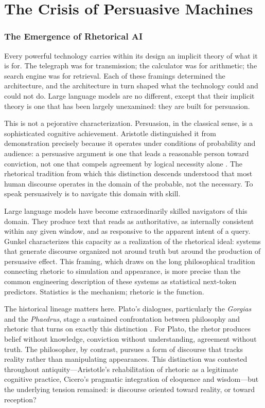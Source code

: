\documentclass[11pt, oneside]{article}
\begin{document}
\newpage
\tableofcontents
\newpage

\part{The Crisis of Persuasive Machines}

\section{The Emergence of Rhetorical AI}

Every powerful technology carries within its design an implicit theory of what it is for. The telegraph was for transmission; the calculator was for arithmetic; the search engine was for retrieval. Each of these framings determined the architecture, and the architecture in turn shaped what the technology could and could not do. Large language models are no different, except that their implicit theory is one that has been largely unexamined: they are built for persuasion.

This is not a pejorative characterization. Persuasion, in the classical sense, is a sophisticated cognitive achievement. Aristotle distinguished it from demonstration precisely because it operates under conditions of probability and audience: a persuasive argument is one that leads a reasonable person toward conviction, not one that compels agreement by logical necessity alone \cite{aristotle_rhetoric}. The rhetorical tradition from which this distinction descends understood that most human discourse operates in the domain of the probable, not the necessary. To speak persuasively is to navigate this domain with skill.

Large language models have become extraordinarily skilled navigators of this domain. They produce text that reads as authoritative, as internally consistent within any given window, and as responsive to the apparent intent of a query. Gunkel \cite{gunkel2026} characterizes this capacity as a realization of the rhetorical ideal: systems that generate discourse organized not around truth but around the production of persuasive effect. This framing, which draws on the long philosophical tradition connecting rhetoric to simulation and appearance, is more precise than the common engineering description of these systems as statistical next-token predictors. Statistics is the mechanism; rhetoric is the function.

The historical lineage matters here. Plato's dialogues, particularly the \textit{Gorgias} and the \textit{Phaedrus}, stage a sustained confrontation between philosophy and rhetoric that turns on exactly this distinction \cite{plato_gorgias, plato_phaedrus}. For Plato, the rhetor produces belief without knowledge, conviction without understanding, agreement without truth. The philosopher, by contrast, pursues a form of discourse that tracks reality rather than manipulating appearances. This distinction was contested throughout antiquity---Aristotle's rehabilitation of rhetoric as a legitimate cognitive practice, Cicero's pragmatic integration of eloquence and wisdom---but the underlying tension remained: is discourse oriented toward reality, or toward reception?
\end{document}

